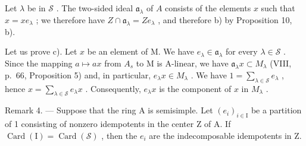 Let \(\lambda\) be in \(\mathcal{S}\) . The two-sided ideal \(\mathfrak{a}_{\lambda}\) of \(A\) consists of the elements \(x\) such that \(x = xe_{\lambda}\) ; we therefore have \(Z \cap \mathfrak{a}_{\lambda} = Ze_{\lambda}\) , and therefore b) by Proposition 10, b).

Let us prove c). Let \(x\) be an element of M. We have \(e_{\lambda} \in \mathfrak{a}_{\lambda}\) for every \(\lambda \in \mathcal{S}\) . Since the mapping \(a \mapsto ax\) from \(A_s\) to M is A-linear, we have \(\mathfrak{a}_{\lambda}x \subset M_{\lambda}\) (VIII, p.~66, Proposition 5) and, in particular, \(e_{\lambda}x \in M_{\lambda}\) . We have \(1 = \sum_{\lambda \in \mathcal{S}} e_{\lambda}\) , hence \(x = \sum_{\lambda \in \mathcal{S}} e_{\lambda}x\) . Consequently, \(e_{\lambda}x\) is the component of \(x\) in \(M_{\lambda}\) .

Remark 4. --- Suppose that the ring A is semisimple. Let \((e_{i})_{i\in\mathrm{I}}\) be a partition of 1 consisting of nonzero idempotents in the center Z of A. If \(\operatorname{Card}(\mathrm{I})=\operatorname{Card}(\mathcal{S})\) , then the \(e_{i}\) are the indecomposable idempotents in Z.

